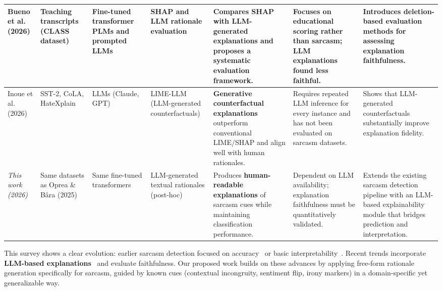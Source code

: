 \begin{table}
\begin{tabular}{L{1.8cm} L{2.4cm} L{2.2cm} L{2.2cm} L{2.6cm} L{2.6cm} L{2.6cm}}
\midrule
Bueno et al. (2026) &
Teaching transcripts (CLASS dataset) &
Fine-tuned transformer PLMs and prompted LLMs &
SHAP and LLM rationale evaluation &
\textbf{Compares SHAP with LLM-generated explanations} and proposes a systematic evaluation framework. &
Focuses on educational scoring rather than sarcasm; LLM explanations found less faithful. &
Introduces deletion-based evaluation methods for assessing explanation faithfulness. \\
\midrule
Inoue et al. (2026) &
SST-2, CoLA, HateXplain &
LLMs (Claude, GPT) &
LIME-LLM (LLM-generated counterfactuals) &
\textbf{Generative counterfactual explanations} outperform conventional LIME/SHAP and align well with human rationales. &
Requires repeated LLM inference for every instance and has not been evaluated on sarcasm datasets. &
Shows that LLM-generated counterfactuals substantially improve explanation fidelity. \\
\midrule
\textit{This work (2026)} &
Same datasets as Oprea \& B\^{a}ra (2025) &
Same fine-tuned transformers &
LLM-generated textual rationales (post-hoc) &
Produces \textbf{human-readable explanations} of sarcasm cues while maintaining classification performance. &
Dependent on LLM availability; explanation faithfulness must be quantitatively validated. &
Extends the existing sarcasm detection pipeline with an LLM-based explainability module that bridges prediction and interpretation. \\
\bottomrule
\end{tabular}
\end{table}

This survey shows a clear evolution: earlier sarcasm detection focused on accuracy~\cite{oprea2025llm} or basic interpretability~\cite{kumar2021explainable,bagate2025sarcasm}. Recent trends incorporate \textbf{LLM-based explanations}~\cite{bueno2026scoring,inoue2026lime} and evaluate faithfulness. Our proposed work builds on these advances by applying free-form rationale generation specifically for sarcasm, guided by known cues (contextual incongruity, sentiment flip, irony markers) in a domain-specific yet generalizable way.
